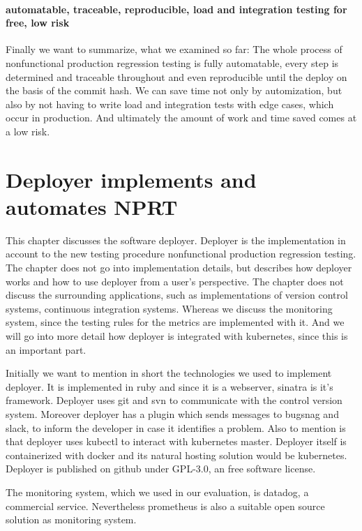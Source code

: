 \subsubsection{automatable, traceable, reproducible, load and integration testing for
  free, low risk}
Finally we want to summarize, what we examined so far: The whole process of nonfunctional
production regression testing is fully automatable, every step is determined and traceable
throughout and even reproducible until the deploy on the basis of the commit hash. We can
save time not only by automization, but also by not having to write load and integration
tests with edge cases, which occur in production. And ultimately the amount of work and
time saved comes at a low risk.

\chapter{Deployer implements and automates NPRT}

This chapter discusses the software deployer. Deployer is the implementation in account to
the new testing procedure nonfunctional production regression testing. The chapter does
not go into implementation details, but describes how deployer works and how to use
deployer from a user's perspective. The chapter does not discuss the surrounding
applications, such as implementations of version control systems, continuous integration
systems. Whereas we discuss the monitoring system, since the testing rules for the metrics
are implemented with it. And we will go into more detail how deployer is integrated with
kubernetes, since this is an important part.

Initially we want to mention in short the technologies we used to implement deployer. It
is implemented in ruby and since it is a webserver, sinatra is it's framework. Deployer
uses git and svn to communicate with the control version system. Moreover deployer has a
plugin which sends messages to bugsnag and slack, to inform the developer in case it
identifies a problem. Also to mention is that deployer uses kubectl to interact with
kubernetes master. Deployer itself is containerized with docker and its natural hosting
solution would be kubernetes. Deployer is published on github under GPL-3.0, an free
software license.

The monitoring system, which we used in our evaluation, is datadog, a commercial
service. Nevertheless prometheus is also a suitable open source solution as monitoring
system.

